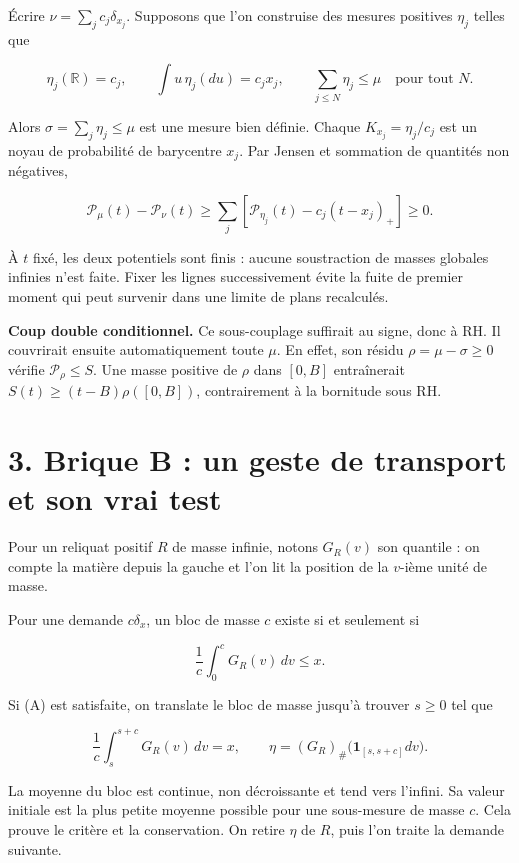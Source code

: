 \documentclass[
  10pt,
  a4paper,
]{article}
\begin{document}
Écrire \(\nu=\sum_jc_j\delta_{x_j}\). Supposons que l'on construise des
mesures positives \(\eta_j\) telles que

\[
\eta_j(\mathbb R)=c_j,\qquad
\int u\,\eta_j(du)=c_jx_j,\qquad
\sum_{j\le N}\eta_j\le\mu\quad\text{pour tout }N.
\]

Alors \(\sigma=\sum_j\eta_j\le\mu\) est une mesure bien définie. Chaque
\(K_{x_j}=\eta_j/c_j\) est un noyau de probabilité de barycentre
\(x_j\). Par Jensen et sommation de quantités non négatives,

\[
\mathcal P_\mu(t)-\mathcal P_\nu(t)
\ge\sum_j\left[\mathcal P_{\eta_j}(t)-c_j(t-x_j)_+\right]\ge0.
\]

À \(t\) fixé, les deux potentiels sont finis : aucune soustraction de
masses globales infinies n'est faite. Fixer les lignes successivement
évite la fuite de premier moment qui peut survenir dans une limite de
plans recalculés.

\textbf{Coup double conditionnel.} Ce sous-couplage suffirait au signe,
donc à RH. Il couvrirait ensuite automatiquement toute \(\mu\). En
effet, son résidu \(\rho=\mu-\sigma\ge0\) vérifie
\(\mathcal P_\rho\le S\). Une masse positive de \(\rho\) dans \([0,B]\)
entraînerait \(S(t)\ge(t-B)\rho([0,B])\), contrairement à la bornitude
sous RH.

\hypertarget{brique-b-un-geste-de-transport-et-son-vrai-test}{%
\section{3. Brique B : un geste de transport et son vrai
test}\label{brique-b-un-geste-de-transport-et-son-vrai-test}}

Pour un reliquat positif \(R\) de masse infinie, notons \(G_R(v)\) son
quantile : on compte la matière depuis la gauche et l'on lit la position
de la \(v\)-ième unité de masse.

Pour une demande \(c\delta_x\), un bloc de masse \(c\) existe si et
seulement si

\[
\frac1c\int_0^cG_R(v)\,dv\le x.
\tag{A}
\]

Si (A) est satisfaite, on translate le bloc de masse jusqu'à trouver
\(s\ge0\) tel que

\[
\frac1c\int_s^{s+c}G_R(v)\,dv=x,\qquad
\eta=(G_R)_\#\bigl(\mathbf1_{[s,s+c]}dv\bigr).
\]

La moyenne du bloc est continue, non décroissante et tend vers l'infini.
Sa valeur initiale est la plus petite moyenne possible pour une
sous-mesure de masse \(c\). Cela prouve le critère et la conservation.
On retire \(\eta\) de \(R\), puis l'on traite la demande suivante.
\end{document}

